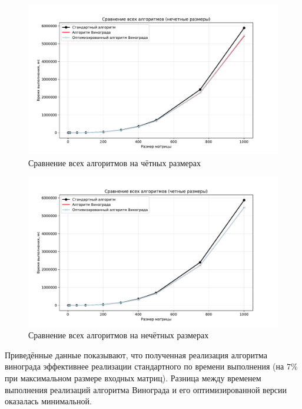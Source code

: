 \begin{figure}[H]
	\hspace*{-2cm}
	\includegraphics[scale=0.8]{images/all_algorithms_odd.pdf}
	\caption{Сравнение всех алгоритмов на чётных размерах}
	\label{img:graph_all_odd}
\end{figure}

\begin{figure}[H]
	\hspace*{-2cm}
	\includegraphics[scale=0.8]{images/all_algorithms_even.pdf}
	\caption{Сравнение всех алгоритмов на нечётных размерах}
	\label{img:graph_all_even}
\end{figure}
\clearpage

Приведённые данные показывают, что полученная реализация алгоритма винограда эффективнее реализации стандартного по времени выполнения (на $7\%$ при максимальном размере входных матриц). Разница между временем выполнения реализаций алгоритма Винограда и его оптимизированной версии оказалась минимальной.

